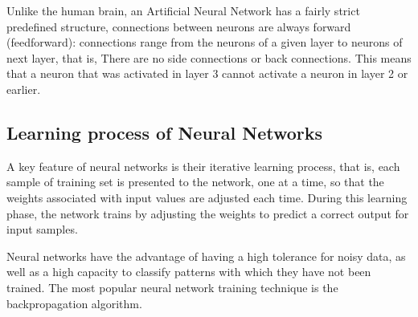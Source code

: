 \vspace{5mm} %

Unlike the human brain, an Artificial Neural Network has a fairly strict predefined structure, connections between neurons are always forward (feedforward): connections range from the neurons of a given layer to neurons of next layer, that is, There are no side connections or back connections. This means that a neuron that was activated in layer 3 cannot activate a neuron in layer 2 or earlier.

\subsection{Learning process of Neural Networks}

A key feature of neural networks is their iterative learning process, that is, each sample of training set is presented to the network, one at a time, so that the weights associated with input values are adjusted each time. During this learning phase, the network trains by adjusting the weights to predict a correct output for input samples.

\vspace{5mm} %

Neural networks have the advantage of having a high tolerance for noisy data, as well as a high capacity to classify patterns with which they have not been trained. The most popular neural network training technique is the backpropagation algorithm.

